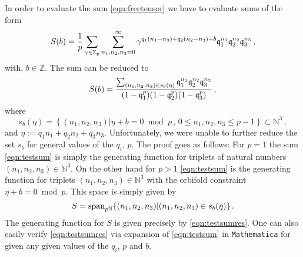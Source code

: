 \documentclass[main.tex]{subfiles}
\begin{document}
In order to evaluate the sum \eqref{eqn:freetensor} we have to evaluate sums of the form
\begin{equation}\label{eqn:testsum}
S(b)=\frac{1}{p}\sum_{\gamma\in\mathbb{Z}_p}\sum_{n_1,n_2,n_3=0}^{\infty}\gamma^{q_1(n_1-n_3)+q_2(n_2-n_3)+b}\mathfrak{q}_1^{n_1}\mathfrak{q}_2^{n_2}\mathfrak{q}_3^{n_3}\,,
\end{equation} 
with, $b\in\mathbb{Z}$. The sum can be reduced to
\begin{equation}\label{eqn:testsumres}
S(b)=\frac{\sum_{(n_1,n_2,n_3)\in s_{b}(\eta)}\mathfrak{q}_1^{n_1}\mathfrak{q}_2^{n_2}\mathfrak{q}_3^{n_3}}{(1-\mathfrak{q}_1^p)(1-\mathfrak{q}_2^p)(1-\mathfrak{q}_3^p)}\,,
\end{equation}
where
\begin{equation}\label{eqn:orbset}
s_{b}(\eta)=\left\{(n_1,n_2,n_3)|\eta+b=0\bmod p\,,\, 0\leq n_1,n_2,n_3\leq p-1\right\}\subset\mathbb{N}^3\,,
\end{equation}
and $\eta:=q_1n_1+q_2n_2+q_3n_3$. Unfortunately, we were unable to further reduce the set $s_b$ for general values of the $q_i$, $p$.
The proof goes as follows: For $p=1$ the sum \eqref{eqn:testsum} is simply the generating function for triplets of natural numbers $(n_1,n_2,n_3)\in\mathbb{N}^3$. On the other hand for $p>1$ \eqref{eqn:testsum} is the generating function for triplets $(n_1,n_2,n_3)\in\mathbb{N}^3$ with the orbifold constraint $\eta+b=0\bmod p$. This space is simply given by 
\begin{equation}
S=\operatorname{span}_{p\mathbb{N}}\{(n_1,n_2,n_3)|(n_1,n_2,n_3)\in s_{b}(\eta)\}\,.
\end{equation}
The generating function for $S$ is given precisely by \eqref{eqn:testsumres}. One can also easily verify \eqref{eqn:testsumres} via expansion of \eqref{eqn:testsum} in \texttt{Mathematica} for given any given values of the $q_i$, $p$ and $b$.  
\end{document}
